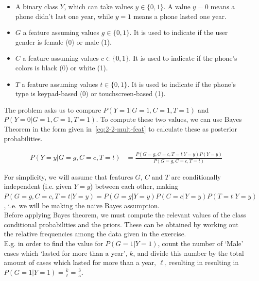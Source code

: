 \documentclass[paper=a4, fontsize=11pt]{scrartcl} %
\numberwithin{equation}{section} %
\numberwithin{figure}{section} %
\numberwithin{table}{section} %
\begin{document}
\begin{itemize}

    \item A binary class $Y$, which can take values $y \in \{0,1\}$. A value 
            $y = 0$ means a phone didn't last one year, while $y = 1$ means 
            a phone lasted one year.
    \item $G$ a feature assuming values $g \in \{0,1\}$. It is used to 
            indicate if the user gender is female (0) or male (1).
    \item $C$ a feature assuming values $c \in \{0,1\}$. It is used to 
            indicate if the phone's colors is 
            black (0) or white (1).
    \item $T$ a feature assuming values $t \in \{0,1\}$. It is used to 
            indicate if the phone's type is 
            keypad-based (0) or touchscreen-based (1).

\end{itemize}

The problem asks us to compare $P(Y = 1|G = 1, C = 1,T = 1)$ and 
$P(Y = 0|G = 1, C = 1,T = 1)$. To compute these two values, we can use Bayes 
Theorem in the form given in~\ref{eq:2-2-mult-feat} to calculate these as 
posterior probabilities.

\begin{equation}
\begin{split}
    P(Y = y|G = g, C = c, T = t)  &= \frac{P(G = g, C = c, T = t|Y = y)P(Y = y)}{P(G = g, C = c, T = t)}
    \label{eq:2-2-mult-feat}
\end{split}
\end{equation}

For simplicity, we will assume that features $G$, $C$ and $T$ are 
conditionally independent (i.e. given $Y = y$) between each other, making 
$P(G = g, C = c,T = t|Y = y) = P(G = g|Y = y)P(C = c|Y = y)P(T = t|Y = y)$, 
i.e. we will be making the naive Bayes assumption.\\ 

Before applying Bayes theorem, we must compute the relevant 
values of the class conditional probabilities and the priors. These can be 
obtained by working out the relative frequencies among 
the data given in the exercise.\\ 

E.g. in order to find the value for 
$P(G = 1|Y = 1)$, count the number of `Male' cases which `lasted for more than a 
year', $k$, and divide this number by the total amount of cases which lasted 
for more than a year, $\ell$, resulting in  resulting in $P(G = 1|Y = 1) = \frac{k}{\ell} 
= \frac{3}{5}$.\\ 
\end{document}
